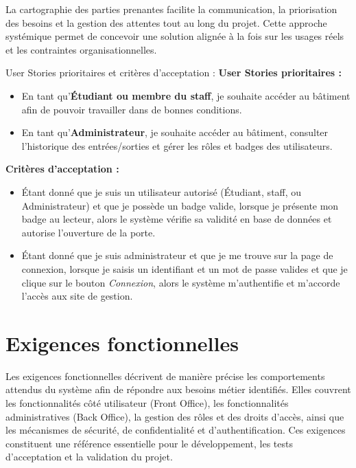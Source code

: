 \textit{\newline}
La cartographie des parties prenantes facilite la communication, la priorisation des besoins et la gestion des attentes tout au long du projet.  
Cette approche systémique permet de concevoir une solution alignée à la fois sur les usages réels et les contraintes organisationnelles.
\textit{\newline}

\begin{for_you}{User Stories prioritaires et critères d’acceptation :}
    \textbf{User Stories prioritaires :}
    \begin{itemize}
        \item En tant qu’\textbf{Étudiant ou membre du staff}, je souhaite accéder au bâtiment afin de pouvoir travailler dans de bonnes conditions.
        \item En tant qu’\textbf{Administrateur}, je souhaite accéder au bâtiment, consulter l’historique des entrées/sorties et gérer les rôles et badges des utilisateurs.
    \end{itemize}

    \textbf{Critères d’acceptation :}
    \begin{itemize}
        \item Étant donné que je suis un utilisateur autorisé (Étudiant, staff, ou Administrateur) et que je possède un badge valide, lorsque je présente mon badge au lecteur, alors le système vérifie sa validité en base de données et autorise l’ouverture de la porte.
        \item Étant donné que je suis administrateur et que je me trouve sur la page de connexion, lorsque je saisis un identifiant et un mot de passe valides et que je clique sur le bouton \emph{Connexion}, alors le système m’authentifie et m’accorde l’accès aux site de gestion.
    \end{itemize}
\end{for_you}

\section{Exigences fonctionnelles}
Les exigences fonctionnelles décrivent de manière précise les comportements attendus du système afin de répondre aux besoins métier identifiés.  
Elles couvrent les fonctionnalités côté utilisateur (Front Office), les fonctionnalités administratives (Back Office), la gestion des rôles et des droits d’accès, ainsi que les mécanismes de sécurité, de confidentialité et d’authentification.  
Ces exigences constituent une référence essentielle pour le développement, les tests d’acceptation et la validation du projet.

